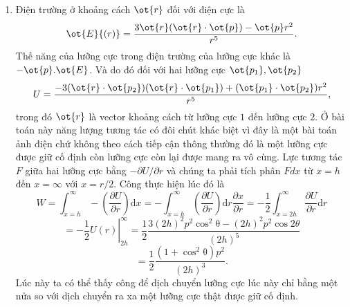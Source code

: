 \begin{loigiai}
\begin{enumerate}[1)]
   \item Điện trường ở khoảng cách $\ot{r}$ đối với điện cực là
     $$\ot{E}{(r)} = \dfrac{3\ot{r}(\ot{r}\cdot \ot{p}) - \ot{p}r^2}{r^5}.$$
      Thế năng của lưỡng cực trong điện trường của lưỡng cực khác là $-\ot{p}.\ot{E}$. Và do đó đối với hai lưỡng cực $\ot{p_1}, \ot{p_2}$
    $$U = \dfrac{-3(\ot{r}\cdot \ot{p_2})(\ot{r}\cdot \ot{p_1}) + (\ot{p_1}\cdot \ot{p_2})r^2}{r^5},$$
  trong đó $\ot{r}$ là vector khoảng cách từ lưỡng cực $1$ đến lưỡng cực $2$. Ở bài toán này năng lượng tương tác có đôi chút khác biệt vì đây là một bài toán ảnh điện chứ không theo cách tiếp cận thông thường đó là một lưỡng cực được giữ cố định còn lưỡng cực còn lại được mang ra vô cùng. Lực tương tác $F$ giữa hai lưỡng cực bằng $-\partial U/\partial{r}$ và chúng ta phải tích phân $Fdx$ từ $x = h$ đến $x = \infty$ với $x = r/2$. Công thực hiện lúc đó là
  \[ W=\int_{x=h}^{\infty}-\left(\dfrac{\partial U}{\partial r}\right)\mathrm{d}x=-\int_{x=h}^{\infty}\left(\dfrac{\partial U}{\partial r}\right)\mathrm{d}r\dfrac{\partial x}{\partial r}=-\dfrac{1}{2}\int_{x=2h}^{\infty}\dfrac{\partial U}{\partial r}\mathrm{d}r\]
  \[=-\left.\dfrac{1}{2}U(r)\right|_{2h}^{\infty}=\dfrac{1}{2}\dfrac{3(2h)^2p^2\mathrm{\cos^2{\theta}}-(2h)^2p^2\cos{2\theta}}{(2h)^5}\]
  \[=\dfrac{1}{2}\dfrac{\left(1+\mathrm{\cos^2{\theta}}\right)p^2}{(2h)^3}.\]
  Lúc này ta có thể thấy công để dịch chuyển lưỡng cực lúc này chỉ bằng một nửa so với dịch chuyển ra xa một lưỡng cực thật được giữ cố định. 
  
\end{enumerate}
\end{loigiai}



